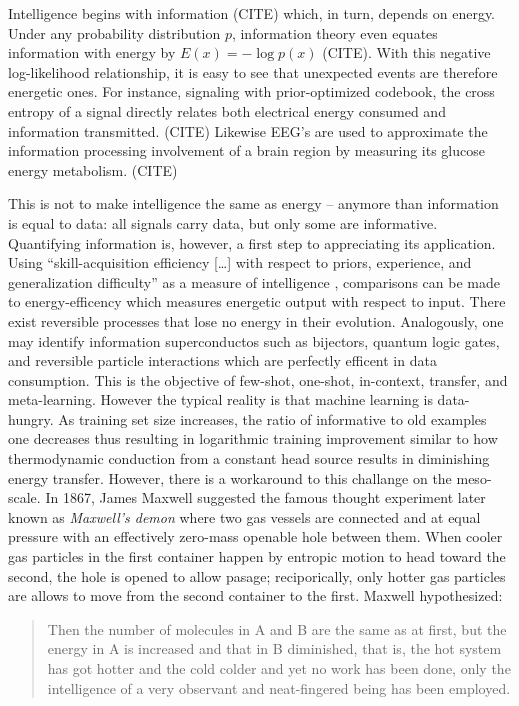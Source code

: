 Intelligence begins with information (CITE) which, in turn, depends on energy. Under any probability distribution $p$, information theory even equates information with energy by $E(x) = - \log{p(x)} $ (CITE). With this negative log-likelihood relationship, it is easy to see that unexpected events are therefore energetic ones. For instance, signaling with prior-optimized codebook, the cross entropy of a signal directly relates both electrical energy consumed and information transmitted. (CITE) Likewise EEG's are used to approximate the information processing involvement of a brain region by measuring its glucose energy metabolism. (CITE)

This is not to make intelligence the same as energy -- anymore than information is equal to data: all signals carry data, but only some are informative. Quantifying information is, however, a first step to appreciating its application. Using ``skill-acquisition efficiency [\dots] with respect to priors, experience, and generalization difficulty'' as a measure of intelligence \citep[27]{Chollet2019}, comparisons can be made to energy-efficency which measures energetic output with respect to input. There exist reversible processes that lose no energy in their evolution. Analogously, one may identify information superconductos such as bijectors, quantum logic gates, and reversible particle interactions which are perfectly efficent in data consumption. This is the objective of few-shot, one-shot, in-context, transfer, and meta-learning. However the typical reality is that machine learning is data-hungry. As training set size increases, the ratio of informative to old examples one decreases thus resulting in logarithmic training improvement similar to how thermodynamic conduction from a constant head source results in diminishing energy transfer. However, there is a workaround to this challange on the meso-scale. In 1867, James Maxwell suggested the famous thought experiment later known as \textit{Maxwell's demon} where two gas vessels are connected and at equal pressure with an effectively zero-mass openable hole between them. When cooler gas particles in the first container happen by entropic motion to head toward the second, the hole is opened to allow pasage; reciporically, only hotter gas particles are allows to move from the second container to the first. Maxwell hypothesized:
\begin{quote}
 Then the number of molecules in A and B are the same as at first, but the energy in A is increased and that in B diminished, that is, the hot system has got hotter and the cold colder and yet no work has been done, only the intelligence of a very observant and neat-fingered being has been employed. \cite[214]{knott_tait_2015}
\end{quote}
